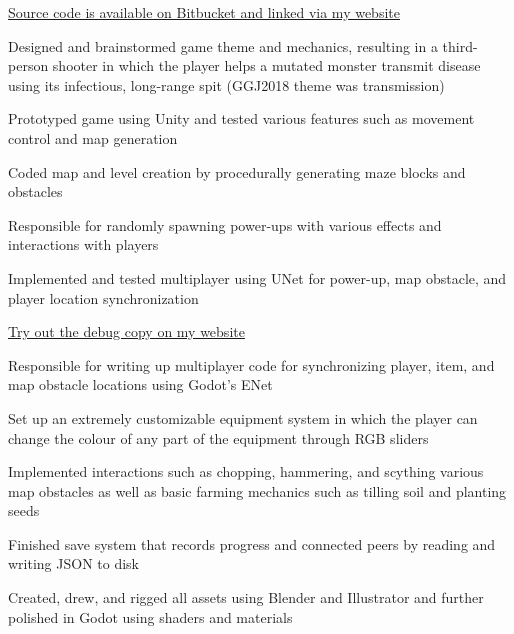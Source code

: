 \documentclass[]{deedy-resume-openfont}
\begin{document}
\begin{tightemize}
\item {\href{https://bitbucket.org/mitchma/ggj2018}{Source code is available on Bitbucket and linked via my website}}
\item Designed and brainstormed game theme and mechanics, resulting in a third-person shooter in which the player helps a mutated monster transmit disease using its infectious, long-range spit (GGJ2018 theme was transmission)
\item Prototyped game using Unity and tested various features such as movement control and map generation
\item Coded map and level creation by procedurally generating maze blocks and obstacles
\item Responsible for randomly spawning power-ups with various effects and interactions with players
\item Implemented and tested multiplayer using UNet for power-up, map obstacle, and player location synchronization
\end{tightemize}
\sectionsep

\begin{tightemize}
\item {\href{https://mitchma.bitbucket.io/}{Try out the debug copy on my website}}
\item Responsible for writing up multiplayer code for synchronizing player, item, and map obstacle locations using Godot's ENet
\item Set up an extremely customizable equipment system in which the player can change the colour of any part of the equipment through RGB sliders
\item Implemented interactions such as chopping, hammering, and scything various map obstacles as well as basic farming mechanics such as tilling soil and planting seeds
\item Finished save system that records progress and connected peers by reading and writing JSON to disk
\item Created, drew, and rigged all assets using Blender and Illustrator and further polished in Godot using shaders and materials
\end{tightemize}
\sectionsep
\end{document}

